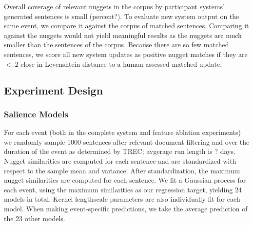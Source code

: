 Overall coverage of
relevant nuggets in the corpus  by participant systems' generated sentences
is small (percent?).
To evaluate new system output on the same event, we compare it against the
corpus of matched sentences. Comparing it against the nuggets would not yield
meaningful results as the nuggets are much smaller than the sentences of the
corpus.
Because there are so few matched sentences, we score all new system updates as positive
nugget matches if they are $< .2$ close in Levenshtein distance to a human
assessed matched update. 

\subsection{Experiment Design}

\subsubsection{Salience Models}
For each event (both in the complete system and feature ablation experiments)
we randomly sample 1000 sentences after relevant document filtering and 
over the duration of the event 
as determined by 
TREC; avgerage run length is ? days.
Nugget similarities
are computed for each sentence and are standardized with respect to 
the sample mean and variance. After standardization, the maximum nugget
similarities are computed for each sentence.
We fit a Gaussian process for each event, using the maximum similarities 
as our regression target, yielding 24 models in total. Kernel lengthscale
parameters are also individually fit for each model.
When making event-specific predictions, we take the average prediction of the
23 other models.


